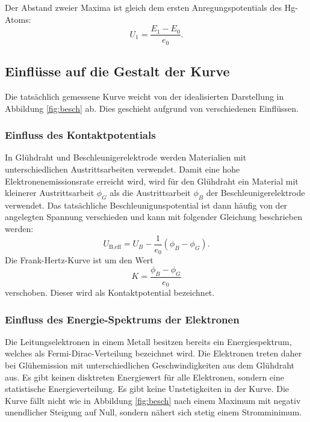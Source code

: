 \noindent Der Abstand zweier Maxima ist gleich dem ersten Anregungspotentials des Hg-Atoms:
\begin{equation}
  \label{eq:pot}
  U_1 = \frac{E_1 - E_0}{e_0}  .
\end{equation}
 \subsection{Einflüsse auf die Gestalt der Kurve}
Die tatsächlich gemessene Kurve weicht von der idealisierten Darstellung in Abbildung \ref{fig:besch} ab.
Dies geschieht aufgrund von verschiedenen Einflüssen.
\subsubsection{Einfluss des Kontaktpotentials}
In Glühdraht und Beschleunigerelektrode werden Materialien mit unterschiedlichen Austrittsarbeiten verwendet.
Damit eine hohe Elektronenemissionsrate erreicht wird, wird für den Glühdraht ein Material mit kleinerer Austrittsarbeit $\phi_G$ als die Austrittsarbeit $\phi_B$ der Beschleunigerelektrode verwendet.
Das tatsächliche Beschleunigunspotential ist dann häufig von der angelegten Spannung verschieden und kann mit folgender Gleichung beschrieben werden:
\begin{equation}
  U_\text{B,eff}= U_B-\frac{1}{e_0}(\phi_B -\phi_G) .
\end{equation}
Die Frank-Hertz-Kurve ist um den Wert
\begin{equation}
  \label{eq:k}
  K = \frac{\phi_B - \phi_G}{e_0}
\end{equation}
verschoben.
Dieser wird als Kontaktpotential bezeichnet.
\subsubsection{Einfluss des Energie-Spektrums der Elektronen}
Die Leitungselektronen in einem Metall besitzen bereits ein Energiespektrum, welches als Fermi-Dirac-Verteilung bezeichnet wird.
Die Elektronen treten daher bei Glühemission mit unterschiedlichen Geschwindigkeiten aus dem Glühdraht aus.
Es gibt keinen disktreten Energiewert für alle Elektronen, sondern eine statistische Energieverteilung.
Es gibt keine Unstetigkeiten in der Kurve.
Die Kurve fällt nicht wie in Abbildung \ref{fig:besch} nach einem Maximum mit negativ unendlicher Steigung auf Null, sondern nähert sich stetig einem Stromminimum.
